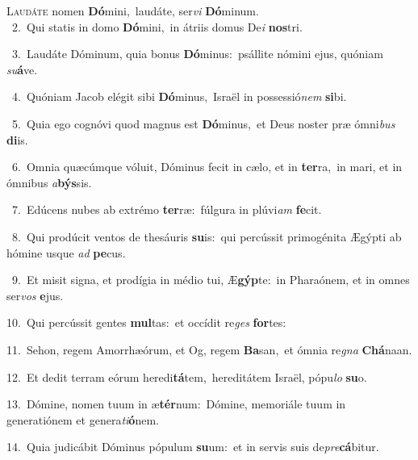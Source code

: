 \lettrine{\initial\textcolor{\initialcolor}{L}}{audáte} nomen \textbf{Dó}\-mini,~\star laudáte, ser\textit{vi} \textbf{Dó}\-minum.\\
{\numbfont\textcolor{\numbcolor}{~2.}}~Qui statis in domo \textbf{Dó}\-mini,~\star in átriis domus De\textit{i} \textbf{nos}\-tri.\par
{\numbfont\textcolor{\numbcolor}{~3.}}~Laudáte Dóminum, quia bonus \textbf{Dó}\-minus:~\star psállite nómini ejus, quóniam \textit{su}\-\textbf{á}ve.\par
{\numbfont\textcolor{\numbcolor}{~4.}}~Quóniam Jacob elégit sibi \textbf{Dó}\-minus,~\star Israël in possessió\textit{nem} \textbf{si}\-bi.\par
{\numbfont\textcolor{\numbcolor}{~5.}}~Quia ego cognóvi quod magnus est \textbf{Dó}\-minus,~\star et Deus noster præ ómni\textit{bus} \textbf{di}\-is.\par
{\numbfont\textcolor{\numbcolor}{~6.}}~Omnia quæcúmque vóluit, Dóminus fecit in cælo, et in \textbf{ter}\-ra,~\star in mari, et in ómnibus \textit{a}\-\textbf{býs}sis.\par
{\numbfont\textcolor{\numbcolor}{~7.}}~Edúcens nubes ab extrémo \textbf{ter}\-ræ:~\star fúlgura in plúvi\textit{am} \textbf{fe}\-cit.\par
{\numbfont\textcolor{\numbcolor}{~8.}}~Qui prodúcit ventos de thesáuris \textbf{su}\-is:~\star qui percússit primogénita Ægýpti ab hómine usque \textit{ad} \textbf{pe}\-cus.\par
{\numbfont\textcolor{\numbcolor}{~9.}}~Et misit signa, et prodígia in médio tui, Æ\-\textbf{gýp}\-te:~\star in Pharaónem, et in omnes ser\textit{vos} \textbf{e}\-jus.\par
{\numbfont\textcolor{\numbcolor}{10.}}~Qui percússit gentes \textbf{mul}\-tas:~\star et occídit re\textit{ges} \textbf{for}\-tes:\par
{\numbfont\textcolor{\numbcolor}{11.}}~Sehon, regem Amorrhæórum, et Og, regem \textbf{Ba}\-san,~\star et ómnia re\textit{gna} \textbf{Chá}\-naan.\par
{\numbfont\textcolor{\numbcolor}{12.}}~Et dedit terram eórum heredi\-\textbf{tá}\-tem,~\star hereditátem Israël, pópu\textit{lo} \textbf{su}\-o.\par
{\numbfont\textcolor{\numbcolor}{13.}}~Dómine, nomen tuum in æ\-\textbf{tér}\-num:~\star Dómine, memoriále tuum in generatiónem et genera\-\textit{ti}\-\textbf{ó}nem.\par
{\numbfont\textcolor{\numbcolor}{14.}}~Quia judicábit Dóminus pópulum \textbf{su}\-um:~\star et in servis suis de\-\textit{pre}\-\textbf{cá}bitur.\par
